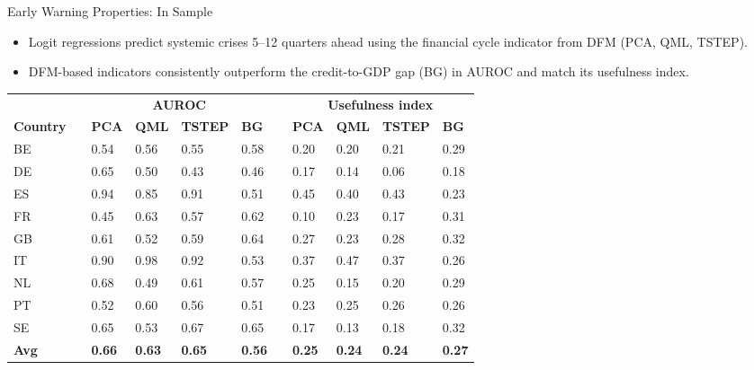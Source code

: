 \documentclass{beamer}
\begin{document}
\begin{frame}{Early Warning Properties: In Sample}

\begin{itemize}
    \item Logit regressions predict systemic crises 5–12 quarters ahead using the financial cycle indicator from DFM (PCA, QML, TSTEP).
    \item DFM-based indicators consistently outperform the credit-to-GDP gap (BG) in AUROC and match its usefulness index.
\end{itemize}

\vspace{0.2cm}

\scriptsize
\centering
\begin{adjustbox}{max width=\linewidth}
\begin{tabularx}{\textwidth}{l p{0.1cm} X X X X p{0.25cm} X X X X}
\toprule
      &       & \multicolumn{4}{c}{\textbf{AUROC}} &       & \multicolumn{4}{c}{\textbf{Usefulness index}} \\
\cmidrule{3-6}\cmidrule{8-11}
\textbf{Country} &       & \textbf{PCA} & \textbf{QML} & \textbf{TSTEP} & \textbf{BG} &       & \textbf{PCA} & \textbf{QML} & \textbf{TSTEP} & \textbf{BG} \\
\midrule
BE    &       & 0.54  & 0.56  & 0.55  & 0.58  &       & 0.20  & 0.20  & 0.21  & 0.29 \\
DE    &       & 0.65  & 0.50  & 0.43  & 0.46  &       & 0.17  & 0.14  & 0.06  & 0.18 \\
ES    &       & 0.94  & 0.85  & 0.91  & 0.51  &       & 0.45  & 0.40  & 0.43  & 0.23 \\
FR    &       & 0.45  & 0.63  & 0.57  & 0.62  &       & 0.10  & 0.23  & 0.17  & 0.31 \\
GB    &       & 0.61  & 0.52  & 0.59  & 0.64  &       & 0.27  & 0.23  & 0.28  & 0.32 \\
IT    &       & 0.90  & 0.98  & 0.92  & 0.53  &       & 0.37  & 0.47  & 0.37  & 0.26 \\
NL    &       & 0.68  & 0.49  & 0.61  & 0.57  &       & 0.25  & 0.15  & 0.20  & 0.29 \\
PT    &       & 0.52  & 0.60  & 0.56  & 0.51  &       & 0.23  & 0.25  & 0.26  & 0.26 \\
SE    &       & 0.65  & 0.53  & 0.67  & 0.65  &       & 0.17  & 0.13  & 0.18  & 0.32 \\
\midrule
\textbf{Avg} &       & \textbf{0.66} & \textbf{0.63} & \textbf{0.65} & \textbf{0.56} &       & \textbf{0.25} & \textbf{0.24} & \textbf{0.24} & \textbf{0.27} \\
\bottomrule
\end{tabularx}
\end{adjustbox}

\end{frame}
\end{document}
